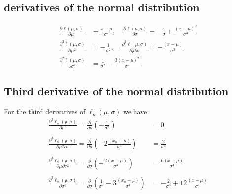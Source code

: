 \documentclass{article}
\begin{document}
\subsection{derivatives of the normal distribution}
\begin{equation*}
\begin{split}
    \frac{\partial \ell\left(\mu, \sigma\right)}{\partial\mu} &= \frac{x - \mu}{\sigma^2}, \quad \frac{\partial \ell\left(\mu,\sigma\right)}{\partial \sigma} = - \frac{1}{\sigma} + \frac{\left(x - \mu\right)^2}{\sigma^3} \\
    \frac{\partial^2 \ell\left(\mu, \sigma\right)}{\partial \mu ^2} &= -\frac{1}{\sigma^2}, \quad \frac{\partial^2 \ell\left(\mu, \sigma\right)}{\partial \mu \partial\sigma} = -\frac{\left(x - \mu\right)}{\sigma^3} \\
    \frac{\partial^2 \ell\left(\mu, \sigma\right)}{\partial \sigma^2} &= \frac{1}{\sigma^2} - \frac{3\left(x - \mu\right)^2}{\sigma^4}
\end{split}
\end{equation*}{}
\subsection{Third derivative of the normal distribution}
For the third derivatives of $\ell_n\left(\mu, \sigma\right)$ we have 
\begin{equation}
  \begin{split}
  \frac{\partial^3 \ell_n\left(\mu, \sigma\right)}{\partial\mu^3} = \frac{\partial}{\partial \mu}\left(-\frac{1}{\sigma^2}\right) &= 0\\ \\
  \frac{\partial^3 \ell_n(\mu, \sigma)}{\partial\mu^2\partial\sigma} = \frac{\partial}{\partial \mu}\left(-2\frac{\left(x_n - \mu\right)}{\sigma^3}\right) & = \frac{2}{\sigma^3} \\ \\
  \frac{\partial^3 \ell_n(\mu, \sigma)}{\partial\mu \partial\sigma^2} = \frac{\partial}{\partial \sigma}\left(-\frac{2\left(x-\mu\right)}{\sigma^3}\right)&= \frac{6\left(x-\mu\right)}{\sigma^4} \\ \\
  \frac{\partial^3\ell_n(\mu, \sigma)}{\partial\sigma^3} = \frac{\partial}{\partial \sigma} \left(\frac{1}{\sigma^2} - 3\frac{\left(x_n - \mu\right)}{\sigma^4}\right)  & = -\frac{2}{\sigma^3}  + 12 \frac{\left(x - \mu \right)}{\sigma^5}
\end{split}
\end{equation}
\end{document}
